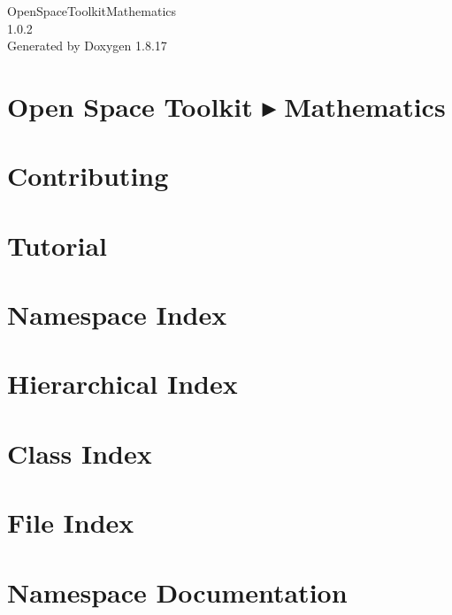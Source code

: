 \let\mypdfximage\pdfximage\def\pdfximage{\immediate\mypdfximage}\documentclass[twoside]{book}
\newcommand{\+}{\discretionary{\mbox{\scriptsize$\hookleftarrow$}}{}{}}
\newcommand{\clearemptydoublepage}{%
  \newpage{\pagestyle{empty}\cleardoublepage}%
}
\begin{document}
\hypersetup{pageanchor=false,
             bookmarksnumbered=true,
             pdfencoding=unicode
            }
\begin{titlepage}
\vspace*{7cm}
\begin{center}%
{\Large Open\+Space\+Toolkit\+Mathematics \\[1ex]\large 1.\+0.\+2 }\\
\vspace*{1cm}
{\large Generated by Doxygen 1.8.17}\\
\end{center}
\end{titlepage}
\clearemptydoublepage
{}
\tableofcontents
\clearemptydoublepage
{}
\hypersetup{pageanchor=true}

\chapter{Open Space Toolkit ▸ Mathematics}
\label{index}\hypertarget{index}{}
\chapter{Contributing}
\label{md__c_o_n_t_r_i_b_u_t_i_n_g}

\chapter{Tutorial}
\label{md_docs__tutorial}

\chapter{Namespace Index}

\chapter{Hierarchical Index}

\chapter{Class Index}

\chapter{File Index}

\chapter{Namespace Documentation}













\end{document}
